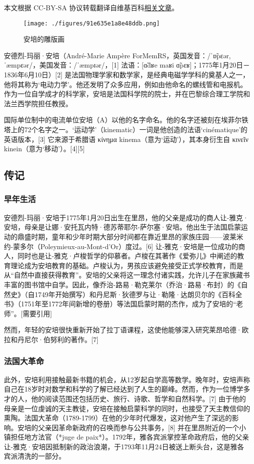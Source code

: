 
本文根据 CC-BY-SA 协议转载翻译自维基百科\href{https://en.wikipedia.org/wiki/Andr\%C3\%A9-Marie_Amp\%C3\%A8re}{相关文章}。
\begin{figure}[ht]
\centering
\texttt{[image: ./figures/91e635e1a8e48ddb.png]}
\caption{安培的雕版画} \label{fig_AP_2}
\end{figure}
安德烈-玛丽·安培（André-Marie Ampère ForMemRS，英国发音：/ˈɒ̃pɛər, ˈæmpɛər/，美国发音：/ˈæmpɪər/，[1] 法语：[ɑ̃dʁe maʁi ɑ̃pɛʁ]；1775年1月20日－1836年6月10日）[2] 是法国物理学家和数学家，是经典电磁学学科的奠基人之一，他将其称为‘电动力学’。他还发明了众多应用，例如由他命名的螺线管和电报机。作为一位自学成才的科学家，安培是法国科学院的院士，并在巴黎综合理工学院和法兰西学院担任教授。

国际单位制中的电流单位安培（A）以他的名字命名。他的名字还被刻在埃菲尔铁塔上的72个名字之一。‘运动学’（kinematic）一词是他创造的法语‘cinématique’的英语版本，[3] 它来源于希腊语 κίνημα kinema（意为‘运动’），其本身衍生自 κινεῖν kinein（意为‘移动’）。[4][5]
\subsection{传记}
\subsubsection{早年生活} 
安德烈-玛丽·安培于1775年1月20日出生在里昂，他的父亲是成功的商人让-雅克·安培，母亲是让娜·安托瓦内特·德苏蒂耶尔-萨尔塞·安培。他出生于法国启蒙运动的鼎盛时期，童年和少年时期大部分时间都在靠近里昂的家族庄园——波莱米约-蒙多尔（Poleymieux-au-Mont-d'Or）度过。[6] 让-雅克·安培是一位成功的商人，同时也是让-雅克·卢梭哲学的仰慕者。卢梭在其著作《爱弥儿》中阐述的教育理论成为安培教育的基础。卢梭认为，男孩应该避免接受正式学校教育，而是从“自然中直接获得教育”。安培的父亲将这一理念付诸实践，允许儿子在家族藏书丰富的图书馆中自学。因此，像乔治-路易·勒克莱尔（乔治·路易·布封）的《自然史》（自1749年开始撰写）和丹尼斯·狄德罗与让·勒隆·达朗贝尔的《百科全书》（1751年至1772年间新增的卷册）等法国启蒙时期的杰作，成为了安培的“老师”。[需要引用]  

然而，年轻的安培很快重新开始了拉丁语课程，这使他能够深入研究莱昂哈德·欧拉和丹尼尔·伯努利的著作。[7]
\subsubsection{法国大革命}
此外，安培利用接触最新书籍的机会，从12岁起自学高等数学。晚年时，安培声称自己在18岁时对数学和科学的了解已经达到了人生的巅峰。然而，作为一位博学多才的人，他的阅读范围还包括历史、旅行、诗歌、哲学和自然科学。[7] 由于他的母亲是一位虔诚的天主教徒，安培在接触启蒙科学的同时，也接受了天主教信仰的熏陶。法国大革命（1789-1799）在他的少年时代爆发，这对他产生了深远的影响。安培的父亲因革命新政府的召唤而参与公共事务，[8] 并在里昂附近的一个小镇担任地方法官（*juge de paix*）。1792年，雅各宾派掌控革命政府后，他的父亲让-雅克·安培因抵制新的政治浪潮，于1793年11月24日被送上断头台，这是雅各宾派清洗的一部分。

